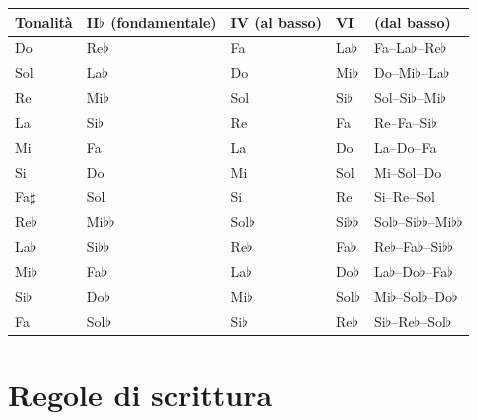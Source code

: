 \begin{center}
\small
\begin{tabularx}{\linewidth}{lLLLL}
\toprule
\textbf{Tonalità} & \textbf{II$\flat$ (fondamentale)} & \textbf{IV (al basso)} & \textbf{VI} & \textbf{ (dal basso)} \\
\midrule
Do & Re$\flat$ & Fa & La$\flat$ & Fa--La$\flat$--Re$\flat$ \\
Sol & La$\flat$ & Do & Mi$\flat$ & Do--Mi$\flat$--La$\flat$ \\
Re & Mi$\flat$ & Sol & Si$\flat$ & Sol--Si$\flat$--Mi$\flat$ \\
La & Si$\flat$ & Re & Fa & Re--Fa--Si$\flat$ \\
Mi & Fa & La & Do & La--Do--Fa \\
Si & Do & Mi & Sol & Mi--Sol--Do \\
Fa$\sharp$ & Sol & Si & Re & Si--Re--Sol \\
Re$\flat$ & Mi$\flat\flat$ & Sol$\flat$ & Si$\flat\flat$ & Sol$\flat$--Si$\flat\flat$--Mi$\flat\flat$ \\
La$\flat$ & Si$\flat\flat$ & Re$\flat$ & Fa$\flat$ & Re$\flat$--Fa$\flat$--Si$\flat\flat$ \\
Mi$\flat$ & Fa$\flat$ & La$\flat$ & Do$\flat$ & La$\flat$--Do$\flat$--Fa$\flat$ \\
Si$\flat$ & Do$\flat$ & Mi$\flat$ & Sol$\flat$ & Mi$\flat$--Sol$\flat$--Do$\flat$ \\
Fa & Sol$\flat$ & Si$\flat$ & Re$\flat$ & Si$\flat$--Re$\flat$--Sol$\flat$ \\
\bottomrule
\end{tabularx}
\end{center}

\section{Regole di scrittura}
\label{sec:regole_napoletana}

